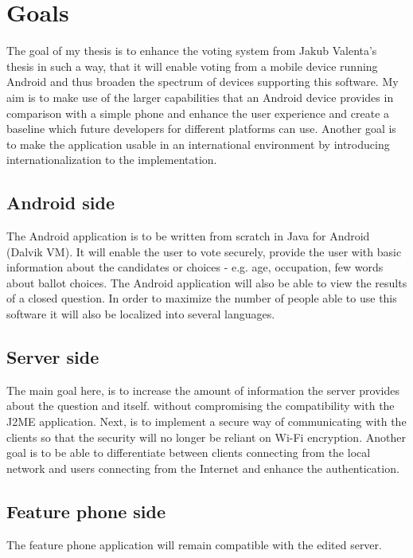 \documentclass[11pt,twoside,a4paper]{book}
\begin{document}
\section{Goals}

The goal of my thesis is to enhance the voting system from Jakub Valenta's\cite{bakalarkaJV} thesis in such a way, that it will enable voting from a mobile device running Android\cite{whatisAnd} and thus broaden the spectrum of devices supporting this software. My aim is to make use of the larger capabilities that an Android device provides in comparison with a simple phone and enhance the user experience and create a baseline which future developers for different platforms can use. Another goal is to make the application usable in an international environment by introducing internationalization to the implementation.

\subsection{Android side}
The Android application is to be written from scratch in Java for Android (Dalvik VM\cite{DalvikVM}). It will enable the user to vote securely, provide the user with basic information about the candidates or choices - e.g. age, occupation, few words about ballot choices. The Android application will also be able to view the results of a closed question. In order to maximize the number of people able to use this software it will also be localized into several languages.

\subsection{Server side}
The main goal here, is to increase the amount of information the server provides about the question and itself. without compromising the compatibility with the J2ME application. Next, is to implement a secure way of communicating with the clients so that the security will no longer be reliant on Wi-Fi encryption. Another goal is to be able to differentiate between clients connecting from the local network and users connecting from the Internet and enhance the authentication.




\subsection{Feature phone side}
The feature phone application will remain compatible with the edited server. \\
\end{document}
